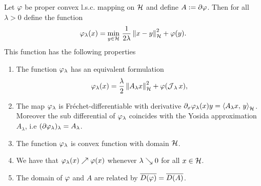\begin{proposition}\label{proposition:yosida approx of prop lsc conv}
	Let $\varphi$ be proper convex l.s.c. mapping on $ \mathcal{H} $ and
	define $ A:=\partial \varphi $. Then for all $ \lambda>0 $ define
	the function
	\begin{align}\label{equation:yosida potential formal def}
		\varphi_\lambda(x)
		=\min_{y\in \mathcal{H}}\,\frac{1}{2\lambda}\left\Vert x-y\right\Vert_{\mathcal{H}}^2+\varphi(y).
	\end{align}
	This function has the following properties
	\begin{enumerate}[label=(\roman*)]
		\item The function $ \varphi_\lambda $ has an equivalent formulation
		\begin{align}\label{equation:yosida potential res def}
			\varphi_\lambda(x)=\frac{\lambda}{2}\left\Vert A_\lambda x\right\Vert_{\mathcal{H}}^2
			+\varphi(\operatorname{\mathcal{J}}_\lambda x),
		\end{align}
		\item The map $ \varphi_\lambda $ is Fréchet-differentiable
		with derivative $ \partial_x\varphi_\lambda(x)y=\left\langle A_\lambda x,\,y\right\rangle_{\mathcal{H}} $.
		Moreover the sub differential of $ \varphi_\lambda $ coincides with
		the Yosida approximation $ A_\lambda $, i.e 
		$ (\partial\varphi_\lambda)_\lambda=A_\lambda $.
		\item  The function $ \varphi_\lambda $ is convex function with domain $ \mathcal{H} $. 
		\item We have that $ \varphi_\lambda(x)\nearrow \varphi(x) $ whenever 
		$ \lambda\searrow 0 $ for all $ x\in \mathcal{H} $.  
		\item The domain of $ \varphi $ and $ A $ are related by 
		$ \overline{D(\varphi)}=\overline{D(A)} $.
	\end{enumerate}
\end{proposition}
